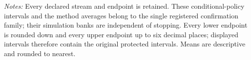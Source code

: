 \par\medskip\noindent\begin{minipage}{\linewidth}\footnotesize\emph{Notes:} Every declared stream and endpoint is retained. These conditional-policy intervals and the method averages belong to the single registered confirmation family; their simulation banks are independent of stopping. Every lower endpoint is rounded down and every upper endpoint up to six decimal places; displayed intervals therefore contain the original protected intervals. Means are descriptive and rounded to nearest.
\end{minipage}
\endgroup
